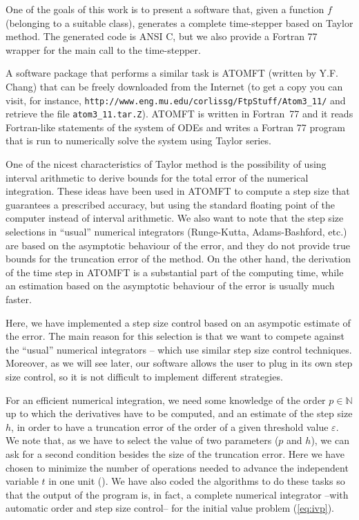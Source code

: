 \documentclass[12pt,twoside]{article}
\newcommand{\NN}{{\mathbb N}}               %
\begin{document}
One of the goals of this work is to present a software that, given a
function $f$ (belonging to a suitable class), generates a complete
time-stepper based on Taylor method. The generated code is ANSI C, but
we also provide a Fortran 77 wrapper for the main call to the
time-stepper.

A software package that performs a similar task is ATOMFT (written by
Y.F. Chang) that can be freely downloaded from the Internet (to get a
copy you can visit, for instance,
\verb-http://www.eng.mu.edu/corlissg/FtpStuff/Atom3_11/- and
retrieve the file \verb-atom3_11.tar.Z-). ATOMFT is written in
Fortran~77 and it reads Fortran-like statements of the system of ODEs
and writes a Fortran 77 program that is run to numerically solve the
system using Taylor series.

One of the nicest characteristics of Taylor method is the possibility
of using interval arithmetic to derive bounds for the total error of
the numerical integration. These ideas have been used in ATOMFT to
compute a step size that guarantees a prescribed accuracy, but using
the standard floating point of the computer instead of interval
arithmetic. We also want to note that the step size selections in
``usual'' numerical integrators (Runge-Kutta, Adams-Bashford, etc.)
are based on the asymptotic behaviour of the error, and they do not
provide true bounds for the truncation error of the method. On the
other hand, the derivation of the time step in ATOMFT is a substantial
part of the computing time, while an estimation based on the
asymptotic behaviour of the error is usually much faster.

Here, we have implemented a step size control based on an asympotic
estimate of the error. The main reason for this selection is that we
want to compete against the ``usual'' numerical integrators -- which
use similar step size control techniques. Moreover, as we will see
later, our software allows the user to plug in its own step size
control, so it is not difficult to implement different strategies.

For an efficient numerical integration, we need some knowledge of the
order $p\in\NN$ up to which the derivatives have to be computed, and
an estimate of the step size $h$, in order to have a truncation error
of the order of a given threshold value $\varepsilon$. We note that,
as we have to select the value of two parameters ($p$ and $h$), we can
ask for a second condition besides the size of the truncation error.
Here we have chosen to minimize the number of operations needed to
advance the independent variable $t$ in one unit (\cite{Simo01a}). We
have also coded the algorithms to do these tasks so that the output of
the program is, in fact, a complete numerical integrator --with
automatic order and step size control-- for the initial value problem
(\ref{eq:ivp}).
\end{document}
